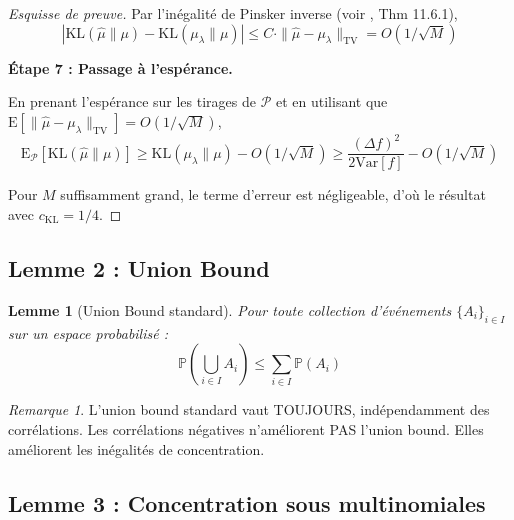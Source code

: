 \documentclass[12pt,a4paper]{article}
\newtheorem{lemma}[theorem]{Lemme}
\theoremstyle{definition}
\theoremstyle{remark}
\newtheorem{remark}[theorem]{Remarque}
\newcommand{\E}{\text{E}}
\newcommand{\Prob}{\mathbb{P}}
\newcommand{\Var}{\text{Var}}
\newcommand{\KL}{\text{KL}}
\newcommand{\TV}{\text{TV}}
\begin{document}
\begin{proof}[Esquisse de preuve]
    Par l'inégalité de Pinsker inverse (voir \cite{cover2006elements}, Thm 11.6.1),
    \begin{equation}
        |\KL(\hat{\mu}\|\mu) - \KL(\mu_\lambda\|\mu)| 
        \leq C \cdot \|\hat{\mu} - \mu_\lambda\|_{\TV} 
        = O(1/\sqrt{M})
    \end{equation}
    
    \textbf{Étape 7 : Passage à l'espérance.}
    
    En prenant l'espérance sur les tirages de $\mathcal{P}$ et en utilisant 
    que $\E[\|\hat{\mu} - \mu_\lambda\|_{\TV}] = O(1/\sqrt{M})$,
    \begin{equation}
        \E_{\mathcal{P}}[\KL(\hat{\mu}\|\mu)] 
        \geq \KL(\mu_\lambda\|\mu) - O(1/\sqrt{M})
        \geq \frac{(\Delta f)^2}{2\Var[f]} - O(1/\sqrt{M})
    \end{equation}
    
    Pour $M$ suffisamment grand, le terme d'erreur est négligeable, 
    d'où le résultat avec $c_{\KL} = 1/4$.


	\end{proof}
	
	\subsection{Lemme 2 : Union Bound}
	
	\begin{lemma}[Union Bound standard]\label{lem:union-bound}
		Pour toute collection d'événements $\{A_i\}_{i\in I}$ sur un espace probabilisé :
		\begin{equation}
			\Prob\left(\bigcup_{i\in I} A_i\right) \leq \sum_{i\in I} \Prob(A_i)
		\end{equation}
	\end{lemma}
	
	\begin{remark}
		L'union bound standard vaut TOUJOURS, indépendamment des corrélations. Les corrélations négatives n'améliorent PAS l'union bound. Elles améliorent les inégalités de concentration.
	\end{remark}
	
	\subsection{Lemme 3 : Concentration sous multinomiales}
	
\end{document}
